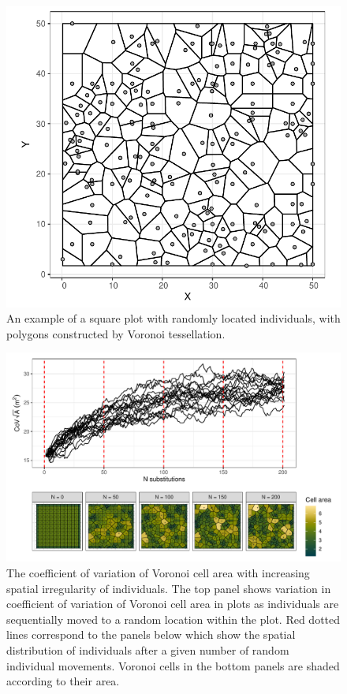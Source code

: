 \documentclass[11pt,a4paper]{article}
\begin{document}
\begin{figure}
\centering
	\includegraphics[width=0.6\linewidth]{voronoi_example}
	\caption{An example of a square plot with \wiki randomly located individuals, with polygons constructed by Voronoi tessellation.}
	\label{voronoi_example}
\end{figure}

\begin{figure}
\centering
	\includegraphics[width=\linewidth]{voronoi_diag}
	\caption{The coefficient of variation of Voronoi cell area with increasing spatial irregularity of individuals. The top panel shows variation in coefficient of variation of Voronoi cell area in \wireps{} plots as individuals are sequentially moved to a random location within the plot. Red dotted lines correspond to the panels below which show the spatial distribution of individuals after a given number of random individual movements. Voronoi cells in the bottom panels are shaded according to their area.}
	\label{voronoi_diag}
\end{figure}
\end{document}
